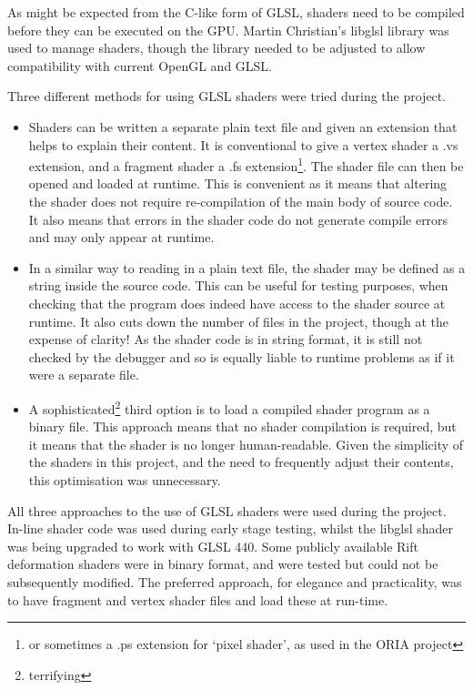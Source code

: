 \documentclass[MSc,paper=a4,pagesize=auto]{icldt}
\begin{document}
As might be expected from the C-like form of GLSL, shaders need to be compiled before they can be executed on the GPU. Martin Christian's libglsl library was used to manage shaders, though the library needed to be adjusted to allow compatibility with current OpenGL and GLSL. 

Three different methods for using GLSL shaders were tried during the project. 
\begin{itemize}
\item Shaders can be written a separate plain text file and given an extension that helps to explain their content. It is conventional to give a vertex shader a .vs extension, and a fragment shader a .fs extension\footnote{or sometimes a .ps extension for `pixel shader', as used in the ORIA project}. The shader file can then be opened and loaded at runtime. This is convenient as it means that altering the shader does not require re-compilation of the main body of source code. It also means that errors in the shader code do not generate compile errors and may only appear at runtime. 
\item In a similar way to reading in a plain text file, the shader may be defined as a string inside the source code. This can be useful for testing purposes, when checking that the program does indeed have access to the shader source at runtime. It also cuts down the number of files in the project, though at the expense of clarity! As the shader code is in string format, it is still not checked by the debugger and so is equally liable to runtime problems as if it were a separate file.
\item A sophisticated\footnote{terrifying} third option is to load a compiled shader program as a binary file. This approach means that no shader compilation is required, but it means that the shader is no longer human-readable. Given the simplicity of the shaders in this project, and the need to frequently adjust their contents, this optimisation was unnecessary.
\end{itemize}

All three approaches to the use of GLSL shaders were used during the project. In-line shader code was used during early stage testing, whilst the libglsl shader was being upgraded to work with GLSL 440. Some publicly available Rift deformation shaders were in binary format, and were tested but could not be subsequently modified. The preferred approach, for elegance and practicality, was to have fragment and vertex shader files and load these at run-time.
\end{document}
